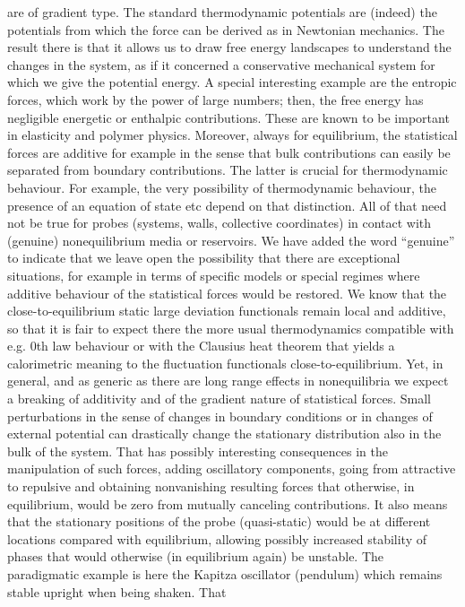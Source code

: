 are of gradient type.  The standard thermodynamic potentials are (indeed) the potentials
from which the force can be derived as in Newtonian mechanics. The result there is that it
allows us to draw free energy landscapes to understand the changes in the system, as if it
concerned a conservative mechanical system for which we give the potential energy.  A
special interesting example are the entropic forces, which work by the power of large
numbers; then, the free energy has negligible energetic or enthalpic contributions.  These
are known to be important in elasticity and polymer physics. Moreover, always for
equilibrium, the statistical forces are additive for example in the sense that bulk
contributions can easily be separated from boundary contributions.  The latter is crucial
for thermodynamic behaviour.  For example, the very possibility of thermodynamic behaviour,
the presence of an equation of state etc depend on that distinction.  All of that need not
be true for probes (systems, walls, collective coordinates) in contact with (genuine)
nonequilibrium media or reservoirs.  We have added the word “genuine” to indicate that we
leave open the possibility that there are exceptional situations, for example in terms of
specific models or special regimes where additive behaviour of the statistical forces would
be restored.  We know that the close-to-equilibrium static large deviation functionals
remain local and additive, so that it is fair to expect there the more usual thermodynamics
compatible with e.g. 0th law behaviour or with the Clausius heat theorem that yields a
calorimetric meaning to the fluctuation functionals close-to-equilibrium.  Yet, in general,
and as generic as there are long range effects in nonequilibria we expect a breaking of
additivity and of the gradient nature of statistical forces. Small perturbations in the
sense of changes in boundary conditions or in changes of external potential can drastically
change the stationary distribution also in the bulk of the system.  That has possibly
interesting consequences in the manipulation of such forces, adding oscillatory components,
going from attractive to repulsive and obtaining nonvanishing resulting forces that
otherwise, in equilibrium, would be zero from mutually canceling contributions.
%
It also means that the stationary positions of the probe (quasi-static) would be at
different locations compared with equilibrium, allowing possibly increased stability of
phases that would otherwise (in equilibrium again) be unstable.  The paradigmatic example is
here the Kapitza oscillator (pendulum) which remains stable upright when being shaken.  That
